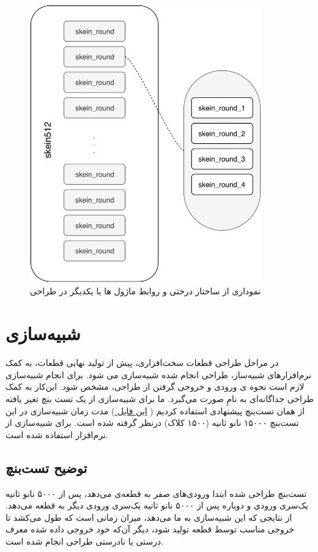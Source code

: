  
 \begin{figure}[H]
 	\centering
 	\includegraphics[width=10cm]{Images/VerilogDocumentation/modules_hierarchy.pdf}	
 	\caption{
 		نموداری از ساختار درختی و روابط ماژول ها با یکدیگر در طراحی
 	}
 \end{figure}
\section{
شبیه‌سازی
}
در مراحل طراحی قطعات سخت‌افزاری، پیش از تولید نهایی قطعات، به کمک نرم‌افزار‌های شبیه‌ساز، طراحی انجام شده شبیه‌سازی می شود. برای انجام شبیه‌سازی لازم است نحوه ی ورودی و خروجی گرفتن از طراحی، مشخص شود. این‌کار به کمک طراحی جداگانه‌ای به نامِ
\textit{}
صورت می‌گیرد. ما برای شبیه‌سازی از یک تست بنچ تغیر یافته از همان تست‌بنچ پیشنهادی استفاده کردیم ( 
\href{https://github.com/VahidZee/SkeinHashingHDL/blob/master/SourceCode/Verilog/testbench.v}
{
	این فایل
} 
)
مدت زمان شبیه‌سازی در این تست‌بنچ ۱۵۰۰۰ نانو ثانیه (۱۵۰۰ کلاک) درنظر گرفته شده است. برای شبیه‌سازی از نرم‌افزار 
\textit{}
استفاده شده است.
\subsection{توضیح تست‌بنچ}
تست‌بنچ طراحی شده ابتدا ورودی‌های صفر به قطعه‌ی
می‌دهد، پس از ۵۰۰۰ نانو ثانیه یک‌سری ورودی و دوباره پس از ۵۰۰۰ ‌نانو ثانیه یک‌سری ورودی دیگر به قطعه می‌دهد. از نتایجی که این شبیه‌سازی به ما می‌دهد، میزان زمانی است که طول می‌کشد تا خروجی مناسب توسط قطعه تولید شود، دیگر آن‌که خود خروجی داده شده معرف درستی یا نا‌درستی طراحی انجام شده است.




